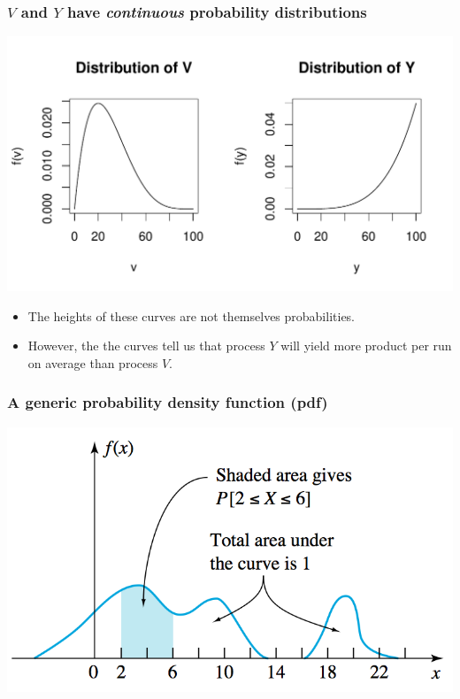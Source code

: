 \documentclass[handout]{beamer}\usepackage[]{graphicx}\usepackage[]{color}
\makeatletter
\def\maxwidth{ %
  \ifdim\Gin@nat@width>\linewidth
    \linewidth
  \else
    \Gin@nat@width
  \fi
}
\newenvironment{knitrout}{}{} %
\numberwithin{equation}{section}
\makeatother
\begin{document}
\begin{frame}
\frametitle{$V$ and $Y$ have \emph{continuous} probability distributions}

\begin{knitrout}
\color{fgcolor}
\includegraphics[width=\maxwidth]{figure/unnamed-chunk-2-1} 

\end{knitrout}
\begin{itemize}
\pause \item The heights of these curves are not themselves probabilities.
\pause \item However, the the curves tell us that process $Y$ will yield more product per run on average than process $V$.
\end{itemize}
\end{frame}

\begin{frame}
\frametitle{A generic probability density function (pdf)}
 \includegraphics{../../fig/genpdf.png}

\end{frame}
\end{document}
